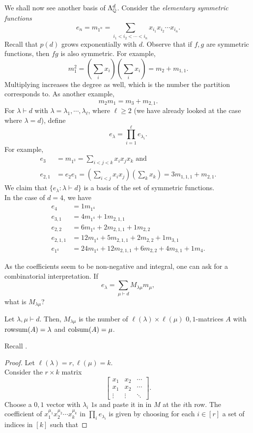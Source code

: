 	We shall now see another basis of $\Lambda_{\mathbb{Q}}^d$. Consider the \emph{elementary symmetric functions}
	\[ e_{n} = m_{1^n} = \sum_{i_1 < i_2 < \cdots < i_n} x_{i_1} x_{i_2} \cdots x_{i_n}. \]
	Recall that $p(d)$ grows exponentially with $d$. Observe that if $f,g$ are symmetric functions, then $fg$ is also symmetric. For example,
	\[ m_1^2 = \left( \sum_i x_i \right)\left( \sum_i x_i \right) = m_2 + m_{1,1}. \]
	Multiplying increases the degree as well, which is the number the partition corresponds to. As another example,
	\[ m_2 m_1 = m_3 + m_{2,1}. \]
	For $\lambda \vdash d$ with $\lambda = \lambda_1,\cdots,\lambda_\ell$, where $\ell \ge 2$ (we have already looked at the case where $\lambda = d$), define
	\[ e_\lambda = \prod_{i=1}^\ell e_{\lambda_i}. \]
	For example,
	\begin{align*}
		e_3 &= m_{1^3} = \sum_{i < j < k} x_i x_j x_k \text{ and} \\
		e_{2,1} &= e_2e_1 = \left(\sum_{i < j} x_i x_j\right) \left(\sum_k x_k\right) = 3m_{1,1,1} + m_{2,1}.
	\end{align*}
	We claim that $\{e_\lambda : \lambda \vdash d\}$ is a basis of the set of symmetric functions.\\
	In the case of $d = 4$, we have
	\begin{align*}
		e_4 &= 1 m_{1^4} \\
		e_{3,1} &= 4m_{1^4} + 1m_{2,1,1} \\
		e_{2,2} &= 6m_{1^4} + 2m_{2,1,1} + 1m_{2,2} \\
		e_{2,1,1} &= 12m_{1^4} + 5m_{2,1,1} + 2m_{2,2} + 1m_{3,1} \\
		e_{1^4} &= 24m_{1^4} + 12m_{2,1,1} + 6m_{2,2} + 4m_{3,1} + 1m_{4}.
	\end{align*}

	As the coefficients seem to be non-negative and integral, one can ask for a combinatorial interpretation. If
	\[ e_\lambda = \sum_{\mu \vdash d} M_{\lambda\mu} m_\mu, \]
	what is $M_{\lambda\mu}$?

	\begin{ftheo}
		\label{theo: sol to rowsum colsum}
		Let $\lambda,\mu \vdash d$. Then, $M_{\lambda\mu}$ is the number of $\ell(\lambda) \times \ell(\mu)$ $0,1$-matrices $A$ with $\operatorname{rowsum}(A) = \lambda$ and $\operatorname{colsum}(A) = \mu$.
	\end{ftheo}
	Recall .
	\begin{proof}
		Let $\ell(\lambda) = r, \ell(\mu) = k$.\\
		Consider the $r \times k$ matrix
		\[ \begin{bmatrix} x_1 & x_2 & \cdots \\ x_1 & x_2 & \cdots \\ \vdots & \vdots & \ddots \end{bmatrix}. \]
		Choose a $0,1$ vector with $\lambda_i$ $1$s and paste it in in $M$ at the $i$th row. The coefficient of $x_1^{\mu_1} x_2^{\mu_2} \cdots x_k^{\mu_k}$ in $\prod_i e_{\lambda_i}$ is given by choosing for each $i \in [r]$ a set of indices in $[k]$ such that
	\end{proof}
	
